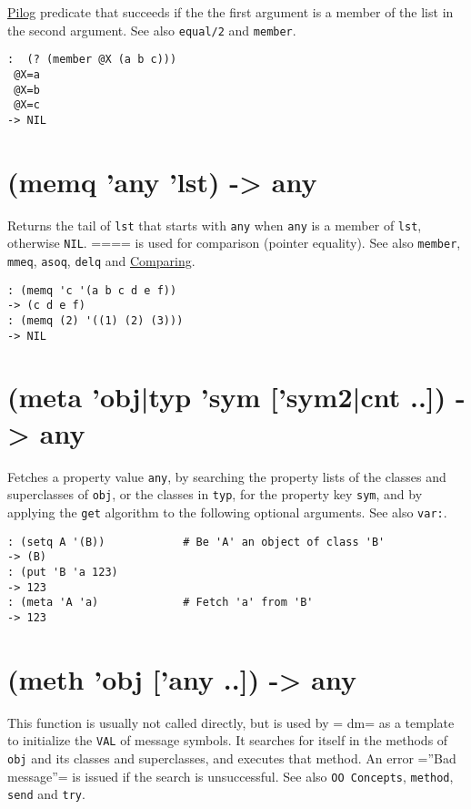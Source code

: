 {{{{{{{\hyperref[ref.html-pilog]{Pilog} predicate that succeeds if the the first
argument is a member of the list in the second argument. See also
\texttt{equal/2} and \texttt{member}.


\begin{verbatim}
:  (? (member @X (a b c)))
 @X=a
 @X=b
 @X=c
-> NIL
\end{verbatim}

 
\section{(memq 'any 'lst) -> any}
\label{sec-8-1-13-22}


Returns the tail of \texttt{lst} that starts with \texttt{any} when \texttt{any} is a member
of \texttt{lst}, otherwise \texttt{NIL}. ==== is used for comparison (pointer
equality). See also \texttt{member}, \texttt{mmeq}, \texttt{asoq}, \texttt{delq} and
\hyperref[ref.html-cmp]{Comparing}.


\begin{verbatim}
: (memq 'c '(a b c d e f))
-> (c d e f)
: (memq (2) '((1) (2) (3)))
-> NIL
\end{verbatim}

 
\section{(meta 'obj|typ 'sym ['sym2|cnt ..]) -> any}
\label{sec-8-1-13-23}


Fetches a property value \texttt{any}, by searching the property lists of the
classes and superclasses of \texttt{obj}, or the classes in \texttt{typ}, for the
property key \texttt{sym}, and by applying the \texttt{get} algorithm to the following
optional arguments. See also \texttt{var:}.


\begin{verbatim}
: (setq A '(B))            # Be 'A' an object of class 'B'
-> (B)
: (put 'B 'a 123)
-> 123
: (meta 'A 'a)             # Fetch 'a' from 'B'
-> 123
\end{verbatim}

 
\section{(meth 'obj ['any ..]) -> any}
\label{sec-8-1-13-24}


This function is usually not called directly, but is used by = dm= as a
template to initialize the \texttt{VAL} of message symbols. It searches for
itself in the methods of \texttt{obj} and its classes and superclasses, and
executes that method. An error =''Bad message''= is issued if the search
is unsuccessful. See also \texttt{OO Concepts}, \texttt{method}, \texttt{send} and \texttt{try}.


}}}}}}}
